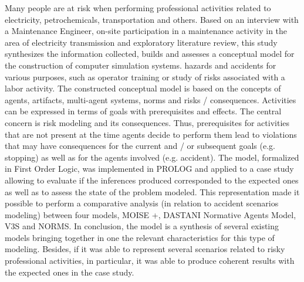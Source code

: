 Many people are at risk when performing professional activities related to electricity, petrochemicals, transportation and others. Based on an interview with a Maintenance Engineer, on-site participation in a maintenance activity in the area of ​​electricity transmission and exploratory literature review, this study synthesizes the information collected, builds and assesses a conceptual model for the construction of computer simulation systems. hazards and accidents for various purposes, such as operator training or study of risks associated with a labor activity. The constructed conceptual model is based on the concepts of agents, artifacts, multi-agent systems, norms and risks / consequences. Activities can be expressed in terms of goals with prerequisites and effects. The central concern is risk modeling and its consequences. Thus, prerequisites for activities that are not present at the time agents decide to perform them lead to violations that may have consequences for the current and / or subsequent goals (e.g. stopping) as well as for the agents involved (e.g. accident). The model, formalized in First Order Logic, was implemented in PROLOG and applied to a case study allowing to evaluate if the inferences produced corresponded to the expected ones as well as to assess the state of the problem modeled. This representation made it possible to perform a comparative analysis (in relation to accident scenarios modeling) between four models, MOISE +, DASTANI Normative Agents Model, V3S and NORMS. In conclusion, the model is a synthesis of several existing models bringing together in one the relevant characteristics for this type of modeling. Besides, if it was able to represent several scenarios related to risky professional activities, in particular, it was able to produce coherent results with the expected ones in the case study.